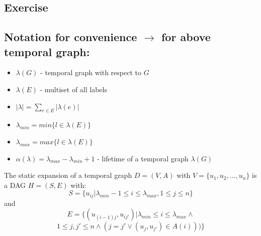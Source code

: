 \documentclass[11pt,a4paper]{article}
\begin{document}
\subsection{Exercise}
\begin{center}
\end{center}


\subsection{Notation for convenience $\rightarrow$ \cite[p. 243ff]{Michail2015}  \hfill { \small \color{black} for above temporal graph: }}
\begin{itemize}
	\item $\lambda(G)$ - temporal graph with respect to $G$ 
	\item $\lambda(E)$ - multiset of all labels
	\item $| \lambda | = \sum_{e \in E} | \lambda(e) | $
	\item $ \lambda_{min} = min\{l \in \lambda(E)\} $
	\item $ \lambda_{max} = max\{l \in \lambda(E)\} $
	\item $\alpha(\lambda) = \lambda_{max} - \lambda_{min} + 1$ - lifetime of a temporal graph $\lambda(G)$
\end{itemize}

\begin{tcolorbox}[title=Definition: static expansion of a graph]
  The static expansion of a temporal graph $D = (V, A)$ with $V = \{ u_1, u_2, ..., u_n \}$ is a DAG $H = (S, E)$ with:
  $$ S = \{ u_{ij} | \lambda_{min} - 1 \leq i \leq \lambda_{max}, 1 \leq j \leq n \} $$
  and
  $$ E = \{ (u_{(i - 1)j}, u_{ij'}) | \lambda_{min} \leq i \leq \lambda_{max} \land $$
  $$ 1 \leq j, j' \leq n \land (j = j' \lor (u_j, u_{j'}) \in A(i))) \} $$
\end{tcolorbox}
\end{document}
